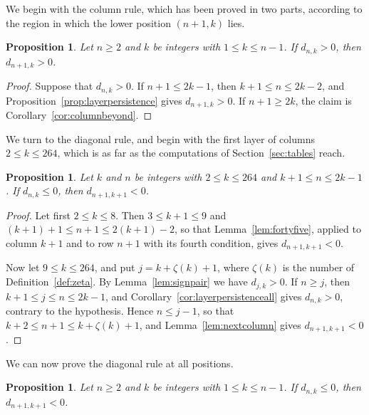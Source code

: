 \documentclass{amsart}
\makeatletter
\newtheorem{proposition}[theorem]{Proposition}
\theoremstyle{definition}
\theoremstyle{remark}
\numberwithin{equation}{section}
\def\subsection{\@startsection{subsection}{2}\z@{.5\linespacing\@plus.7\linespacing}{-.5em}{\normalfont\bfseries\boldmath}}
\makeatother
\begin{document}
\subsection{The two rules}\label{subsec:staircase-rules}

We begin with the column rule, which has been proved in two parts, according
to the region in which the lower position $(n+1,k)$ lies.

\begin{proposition}\label{prop:rulecolumn}
Let $n\ge2$ and $k$ be integers with $1\le k\le n-1$. If $d_{n,k}>0$, then
$d_{n+1,k}>0$.
\end{proposition}

\begin{proof}
Suppose that $d_{n,k}>0$. If $n+1\le2k-1$, then $k+1\le n\le2k-2$, and
Proposition~\ref{prop:layerpersistence} gives $d_{n+1,k}>0$. If
$n+1\ge2k$, the claim is Corollary~\ref{cor:columnbeyond}.
\end{proof}

We turn to the diagonal rule, and
begin with the first layer of columns $2\le k\le264$, which is as far as the
computations of
Section~\ref{sec:tables} reach.

\begin{proposition}\label{prop:rulesmall}
Let $k$ and $n$ be integers with $2\le k\le264$ and $k+1\le n\le2k-1$. If
$d_{n,k}\le0$, then $d_{n+1,k+1}<0$.
\end{proposition}

\begin{proof}
Let first $2\le k\le8$. Then $3\le k+1\le9$ and
$(k+1)+1\le n+1\le2(k+1)-2$, so that Lemma~\ref{lem:fortyfive}, applied to
column $k+1$ and to row $n+1$ with its fourth condition, gives
$d_{n+1,k+1}<0$.

Now let $9\le k\le264$, and put $j=k+\zeta(k)+1$, where $\zeta(k)$ is the
number of Definition~\ref{def:zeta}. By Lemma~\ref{lem:signpair} we have
$d_{j,k}>0$. If $n\ge j$, then $k+1\le j\le n\le2k-1$, and
Corollary~\ref{cor:layerpersistenceall} gives $d_{n,k}>0$, contrary to the
hypothesis. Hence $n\le j-1$, so that $k+2\le n+1\le k+\zeta(k)+1$, and
Lemma~\ref{lem:nextcolumn} gives $d_{n+1,k+1}<0$.
\end{proof}

We can now prove the diagonal rule at all positions.

\begin{proposition}\label{prop:rulediagonal}
Let $n\ge2$ and $k$ be integers with $1\le k\le n-1$. If $d_{n,k}\le0$, then
$d_{n+1,k+1}<0$.
\end{proposition}
\end{document}

